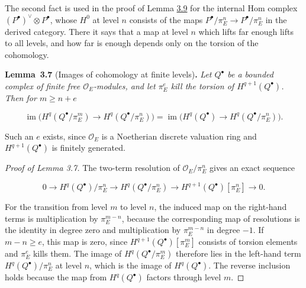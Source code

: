 \documentclass[11pt]{article}
\newenvironment{bpstatement}[2]{\par\addvspace{0.6\baselineskip}\noindent\textbf{#1}#2\textbf{.}\enspace\ignorespaces}
  {\par\addvspace{0.4\baselineskip}}
\newenvironment{bpstatementit}[2]{\begin{bpstatement}{#1}{#2}\itshape\ignorespaces}{\end{bpstatement}}
\begin{document}
\label{bp21}%
The second fact is used in the proof of Lemma \hyperref[bp29]{3.9} for the internal Hom complex \((P^\bullet)^\vee\otimes P^\bullet\), whose \(H^0\) at level \(n\) consists of the maps \(P^\bullet/\pi_E^n\to P^\bullet/\pi_E^n\) in the derived category. There it says that a map at level \(n\) which lifts far enough lifts to all levels, and how far is enough depends only on the torsion of the cohomology.

\label{bp22}%
\begin{bpstatementit}{Lemma~3.7}{ (Images of cohomology at finite levels)}
Let \(Q^\bullet\) be a bounded complex of finite free \(\mathcal O_E\)-modules, and let \(\pi_E^e\) kill the torsion of \(H^{q+1}(Q^\bullet)\). Then for \(m\ge n+e\)

\[
\operatorname{im}\bigl(H^q(Q^\bullet/\pi_E^m)\to
H^q(Q^\bullet/\pi_E^n)\bigr)
=\operatorname{im}\bigl(H^q(Q^\bullet)\to
H^q(Q^\bullet/\pi_E^n)\bigr).
\]
\end{bpstatementit}

\label{bp23}%
Such an \(e\) exists, since \(\mathcal O_E\) is a Noetherian discrete valuation ring and \(H^{q+1}(Q^\bullet)\) is finitely generated.

\begin{proof}[{Proof of Lemma 3.7}]\label{bp24}%
The two-term resolution of \(\mathcal O_E/\pi_E^n\) gives an exact sequence

\[
0\to H^q(Q^\bullet)/\pi_E^n\to H^q(Q^\bullet/\pi_E^n)
\to H^{q+1}(Q^\bullet)[\pi_E^n]\to0.
\]

For the transition from level \(m\) to level \(n\), the induced map on the right-hand terms is multiplication by \(\pi_E^{m-n}\), because the corresponding map of resolutions is the identity in degree zero and multiplication by \(\pi_E^{m-n}\) in degree \(-1\). If \(m-n\ge e\), this map is zero, since \(H^{q+1}(Q^\bullet)[\pi_E^m]\) consists of torsion elements and \(\pi_E^e\) kills them. The image of \(H^q(Q^\bullet/\pi_E^m)\) therefore lies in the left-hand term \(H^q(Q^\bullet)/\pi_E^n\) at level \(n\), which is the image of \(H^q(Q^\bullet)\). The reverse inclusion holds because the map from \(H^q(Q^\bullet)\) factors through level \(m\).
\end{proof}
\end{document}
